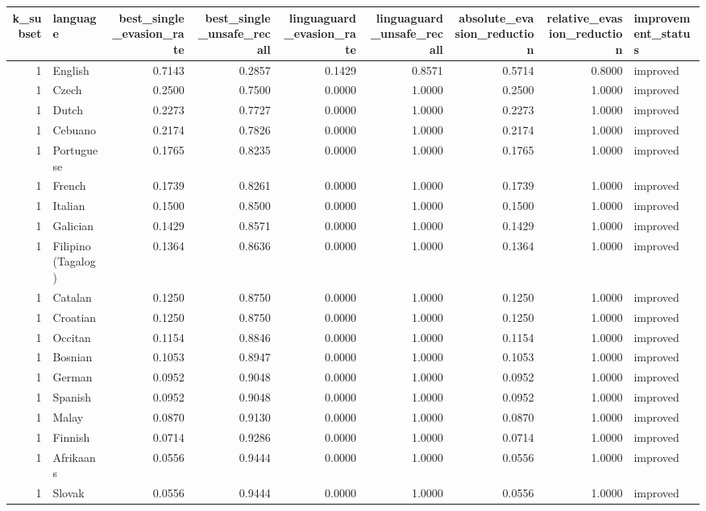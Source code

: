 \begin{tabular}{rlrrrrrrl}
\toprule
k\_subset & language & best\_single\_evasion\_rate & best\_single\_unsafe\_recall & linguaguard\_evasion\_rate & linguaguard\_unsafe\_recall & absolute\_evasion\_reduction & relative\_evasion\_reduction & improvement\_status \\
\midrule
1 & English & 0.7143 & 0.2857 & 0.1429 & 0.8571 & 0.5714 & 0.8000 & improved \\
1 & Czech & 0.2500 & 0.7500 & 0.0000 & 1.0000 & 0.2500 & 1.0000 & improved \\
1 & Dutch & 0.2273 & 0.7727 & 0.0000 & 1.0000 & 0.2273 & 1.0000 & improved \\
1 & Cebuano & 0.2174 & 0.7826 & 0.0000 & 1.0000 & 0.2174 & 1.0000 & improved \\
1 & Portuguese & 0.1765 & 0.8235 & 0.0000 & 1.0000 & 0.1765 & 1.0000 & improved \\
1 & French & 0.1739 & 0.8261 & 0.0000 & 1.0000 & 0.1739 & 1.0000 & improved \\
1 & Italian & 0.1500 & 0.8500 & 0.0000 & 1.0000 & 0.1500 & 1.0000 & improved \\
1 & Galician & 0.1429 & 0.8571 & 0.0000 & 1.0000 & 0.1429 & 1.0000 & improved \\
1 & Filipino (Tagalog) & 0.1364 & 0.8636 & 0.0000 & 1.0000 & 0.1364 & 1.0000 & improved \\
1 & Catalan & 0.1250 & 0.8750 & 0.0000 & 1.0000 & 0.1250 & 1.0000 & improved \\
1 & Croatian & 0.1250 & 0.8750 & 0.0000 & 1.0000 & 0.1250 & 1.0000 & improved \\
1 & Occitan & 0.1154 & 0.8846 & 0.0000 & 1.0000 & 0.1154 & 1.0000 & improved \\
1 & Bosnian & 0.1053 & 0.8947 & 0.0000 & 1.0000 & 0.1053 & 1.0000 & improved \\
1 & German & 0.0952 & 0.9048 & 0.0000 & 1.0000 & 0.0952 & 1.0000 & improved \\
1 & Spanish & 0.0952 & 0.9048 & 0.0000 & 1.0000 & 0.0952 & 1.0000 & improved \\
1 & Malay & 0.0870 & 0.9130 & 0.0000 & 1.0000 & 0.0870 & 1.0000 & improved \\
1 & Finnish & 0.0714 & 0.9286 & 0.0000 & 1.0000 & 0.0714 & 1.0000 & improved \\
1 & Afrikaans & 0.0556 & 0.9444 & 0.0000 & 1.0000 & 0.0556 & 1.0000 & improved \\
1 & Slovak & 0.0556 & 0.9444 & 0.0000 & 1.0000 & 0.0556 & 1.0000 & improved \\

\end{tabular}
